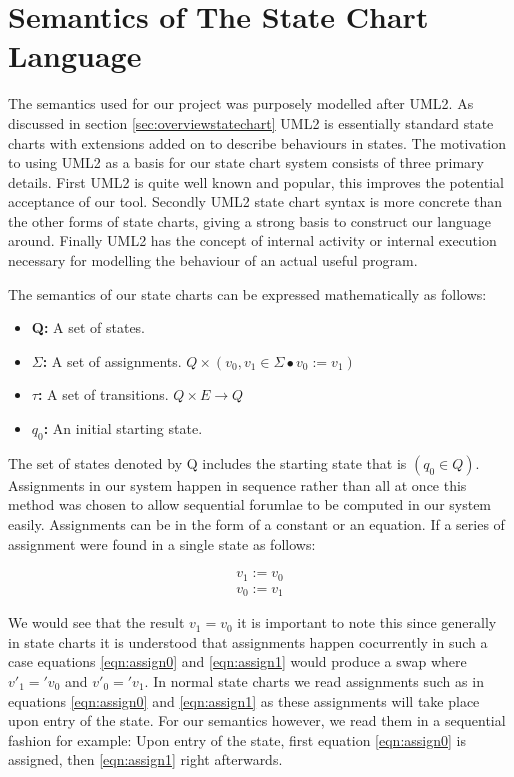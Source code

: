 \section{Semantics of The State Chart Language}

The semantics used for our project was purposely modelled after UML2. As discussed in section \ref{sec:overviewstatechart} UML2 is essentially standard state charts with extensions added on to describe behaviours in states. The motivation to using UML2 as a basis for our state chart system consists of three primary details. First UML2 is quite well known and popular, this improves the potential acceptance of our tool. Secondly UML2 state chart syntax is more concrete than the other forms of state charts, giving a strong basis to construct our language around. Finally UML2 has the concept of internal activity or internal execution necessary for modelling the behaviour of an actual useful program.

The semantics of our state charts can be expressed mathematically as follows:

\begin{itemize}
	\item \textbf{Q:} A set of states.
	\item \textbf{$\Sigma$:} A set of assignments. $Q \times (v_0,v_1 \in \Sigma \bullet v_0 := v_1)$
	\item \textbf{$\tau$:} A set of transitions. $Q \times E \rightarrow Q$
	\item \textbf{$q_0$:} An initial starting state.
\end{itemize}

The set of states denoted by Q includes the starting state that is $(q_0 \in Q)$. Assignments in our system happen in sequence rather than all at once this method was chosen to allow sequential forumlae to be computed in our system easily. Assignments can be in the form of a constant or an equation. If a series of assignment were found in a single state as follows:

\begin{align}
v_1 := v_0 \label{eqn:assign0} \\ 
v_0 := v_1 \label{eqn:assign1}
\end{align}

We would see that the result $v_1 = v_0$ it is important to note this since generally in state charts it is understood that assignments happen cocurrently in such a case equations \ref{eqn:assign0} and \ref{eqn:assign1} would produce a swap where $v'_1 = 'v_0$ and $v'_0 = 'v_1$. In normal state charts we read assignments such as in equations \ref{eqn:assign0} and \ref{eqn:assign1} as these assignments will take place upon entry of the state. For our semantics however, we read them in a sequential fashion for example: Upon entry of the state, first equation \ref{eqn:assign0} is assigned, then \ref{eqn:assign1} right afterwards.

